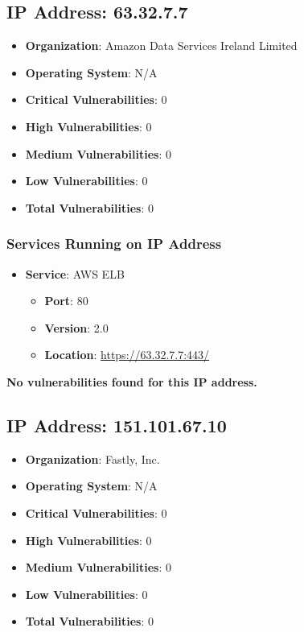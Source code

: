 \documentclass{article}
\begin{document}
\clearpage



\subsection{IP Address: 63.32.7.7}

\begin{itemize}
    \item \textbf{Organization}: Amazon Data Services Ireland Limited
    \item \textbf{Operating System}:  N/A 
    \item \textbf{Critical Vulnerabilities}: 0
    \item \textbf{High Vulnerabilities}: 0
    \item \textbf{Medium Vulnerabilities}: 0
    \item \textbf{Low Vulnerabilities}: 0
    \item \textbf{Total Vulnerabilities}: 0
\end{itemize}

\subsubsection*{Services Running on IP Address}

\begin{itemize}
    
        \item \textbf{Service}: AWS ELB
        \begin{itemize}
            \item \textbf{Port}: 80
            \item \textbf{Version}:  2.0 
            \item \textbf{Location}: \href{ https://63.32.7.7:443/ }{ https://63.32.7.7:443/ }
        \end{itemize}
    
\end{itemize}


\textbf{No vulnerabilities found for this IP address.}




\clearpage



\subsection{IP Address: 151.101.67.10}

\begin{itemize}
    \item \textbf{Organization}: Fastly, Inc.
    \item \textbf{Operating System}:  N/A 
    \item \textbf{Critical Vulnerabilities}: 0
    \item \textbf{High Vulnerabilities}: 0
    \item \textbf{Medium Vulnerabilities}: 0
    \item \textbf{Low Vulnerabilities}: 0
    \item \textbf{Total Vulnerabilities}: 0
\end{itemize}
\end{document}
